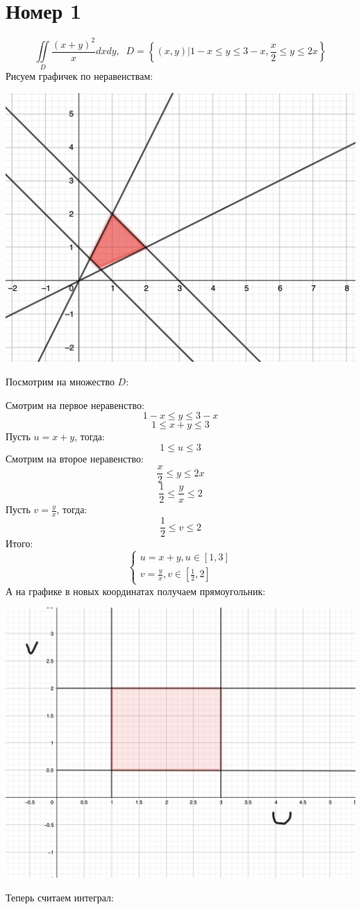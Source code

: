 \documentclass[a4paper,12pt]{article}
\begin{document}
\section*{Номер 1}
\[
\iint\limits_D \frac{(x+y)^2}{x}dxdy, \; \; D = \left\{(x, y) \Big| 1 -x \leq y \leq 3 - x , \frac{x}{2} \leq y \leq 2x \right\}
\]
Рисуем графичек по неравенствам:
\begin{center}
\includegraphics[scale=0.7]{1.png}
\end{center}
\begin{center}
Посмотрим на множество $D$:
\end{center}
Смотрим на первое неравенство:
\[
1 - x \leq y \leq 3 -x
\]
\[
 1 \leq x + y \leq 3
\]
Пусть $u = x + y$, тогда:
\[
1 \leq u \leq 3
\]
Смотрим на второе неравенство:
\[
\frac{x}{2} \leq y \leq 2x
\]
\[
\frac12 \leq \frac{y}{x} \leq 2
\]
Пусть $v = \frac{y}{x}$, тогда:
\[
\frac12 \leq v \leq 2
\]
Итого:
\[
\begin{cases}
u = x + y, u \in [1, 3]
\\
v = \frac{y}{x}, v \in \left[\frac{1}{2}, 2\right] 
\end{cases}
\]
\clearpage
А на графике в новых координатах получаем прямоугольник:
\begin{center}
\includegraphics[scale=0.4]{2.png}
\end{center}
Теперь считаем интеграл:
\end{document}
